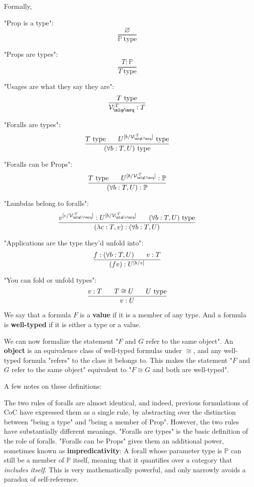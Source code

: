 \documentclass{article}
\newcommand{\Prop}{\mathbb{P}}
\newcommand{\istype}{\ \mathrm{type}}
\newcommand{\usage}{\mathcal{V}}
\newcommand{\usageKnown}[2]{{\usage_{\mlq\hspace{-0.06em}#2\hspace{-0.06em}\mrq}^{:#1}}}
\newcommand{\presep}{\hspace{1.8em}}
\newcommand{\subst}[3]{#1^{[{#2}{/}{#3}]}}
\newcommand{\betaeq}{\cong}
\begin{document}
  Formally,
  
  "Prop is a type":
  \[ \frac{\varnothing}{\Prop\istype} \]  
  
  "Props are types":
  \[ \frac{T : \Prop}{T\istype} \]
  
  "Usages are what they say they are":
  \[ \frac{T\istype}{\usageKnown{T}{i}:T} \]
  
  "Foralls are types":
  \[ \frac{T\istype\presep \subst{U}{b}{\usageKnown{T}{U}}\istype}{(\forall b:T,U)\istype} \]
  
  "Foralls can be Props":
  \[ \frac{T\istype\presep \subst{U}{b}{\usageKnown{T}{U}} : \Prop}{(\forall b:T,U) : \Prop} \]
  
  "Lambdas belong to foralls":
  \[ \frac{\subst{v}{c}{\usageKnown{T}{U\!v}} : \subst{U}{b}{\usageKnown{T}{U\!v}} \presep (\forall b:T,U)\istype}{(\lambda c:T,v) : (\forall b:T,U)} \]
  
  "Applications are the type they'd unfold into":
  \[ \frac{f : (\forall b:T,U) \presep v : T}{(f v) : \subst{U}{b}{v}} \]
  
  "You can fold or unfold types":
  \[ \frac{v : T \presep T \betaeq U \presep U\istype}{v : U} \]
  
  We say that a formula $F$ is a \textbf{value} if it is a member of any type. And a formula is \textbf{well-typed} if it is either a type or a value.
    
  We can now formalize the statement "$F$ and $G$ refer to the same object". An \textbf{object} is an equivalence class of well-typed formulas under $\betaeq$, and any well-typed formula "refers" to the class it belongs to. This makes the statement "$F$ and $G$ refer to the same object" equivalent to "$F \betaeq G$ and both are well-typed".
  
  A few notes on these definitions:
  
  The two rules of foralls are almost identical, and indeed, previous formulations of CoC\cite{coquand1990proof}\cite{rodrigueztype} have expressed them as a single rule, by abstracting over the distinction between "being a type" and "being a member of Prop". However, the two rules have substantially different meanings. "Foralls are types" is the basic definition of the role of foralls. "Foralls can be Props" gives them an additional power, sometimes known as \textbf{impredicativity}: A forall whose parameter type is $\Prop$ can still be a member of $\Prop$ itself, meaning that it quantifies over a category that \emph{includes itself}. This is very mathematically powerful, and only narrowly avoids a paradox of self-reference.
  
\end{document}
